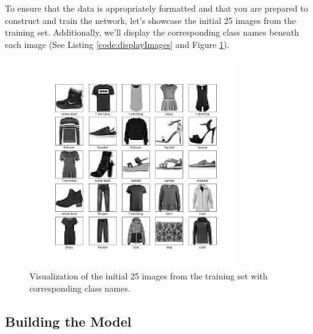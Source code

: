 \begin{code}[h!]
	    
	
	\caption{Data preprocessing to scale pixel values to the range [0, 1].}
	\label{code:dataPreprocessing}
\end{code}

To ensure that the data is appropriately formatted and that you are prepared to construct and train the network, let's showcase the initial 25 images from the training set. Additionally, we'll display the corresponding class names beneath each image (See Listing \ref{code:displayImages} and Figure \ref{fig:first25Images}).

\begin{code}[h!]
	    
	
	\caption{Displaying the initial 25 images from the training set with class names.}
	\label{code:displayImages}
\end{code}

\begin{figure}[h!]
	\centering
	\includegraphics[width=0.8\textwidth]{Images/TensorFlowPackage/first25TrainingImages}
	\caption{Visualization of the initial 25 images from the training set with corresponding class names.} 
	\label{fig:first25Images}
\end{figure}

\subsection{Building the Model}

